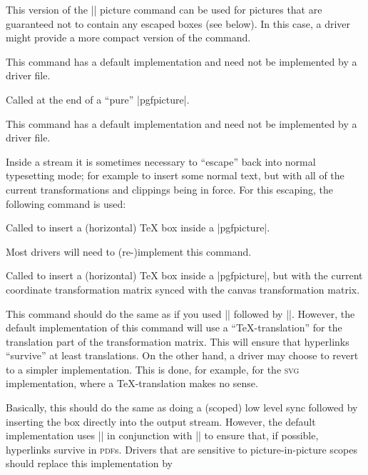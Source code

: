\begin{command}{\pgfsys@beginpurepicture}
    This version of the |\pgfsys@beginpicture| picture command can be used for
    pictures that are guaranteed not to contain any escaped boxes (see below).
    In this case, a driver might provide a more compact version of the command.

    This command has a default implementation and need not be implemented by a
    driver file.
\end{command}

\begin{command}{\pgfsys@endpurepicture}
    Called at the end of a ``pure'' |{pgfpicture}|.

    This command has a default implementation and need not be implemented by a
    driver file.
\end{command}

Inside a stream it is sometimes necessary to ``escape'' back into normal
typesetting mode; for example to insert some normal text, but with all of the
current transformations and clippings being in force. For this escaping, the
following command is used:

\begin{command}{\pgfsys@hbox{}}
    Called to insert a (horizontal) \TeX{} box inside a |{pgfpicture}|.

    Most drivers will need to (re-)implement this command.
\end{command}

\begin{command}{\pgfsys@hboxsynced{}}
    Called to insert a (horizontal) \TeX{} box inside a |{pgfpicture}|, but with
    the current coordinate transformation matrix synced with the canvas
    transformation matrix.

    This command should do the same as if you used |\pgflowlevelsynccm|
    followed by |\pgfsys@hbox|. However, the default implementation of this
    command will use a ``\TeX{}-translation'' for the translation part of the
    transformation matrix. This will ensure that hyperlinks ``survive'' at
    least translations. On the other hand, a driver may choose to revert to a
    simpler implementation. This is done, for example, for the \textsc{svg}
    implementation, where a \TeX-translation makes no sense.
\end{command}

\begin{command}{\pgfsys@pictureboxsynced{}}
    Basically, this should do the same as doing a (scoped) low level sync
    followed by inserting the box  directly into the output
    stream. However, the default implementation uses |\pgfsys@hboxsynced| in
    conjunction with |\pgfsys@beginpicture| to ensure that, if possible,
    hyperlinks survive in \textsc{pdf}s. Drivers that are sensitive to
    picture-in-picture scopes should replace this implementation by
\end{command}


